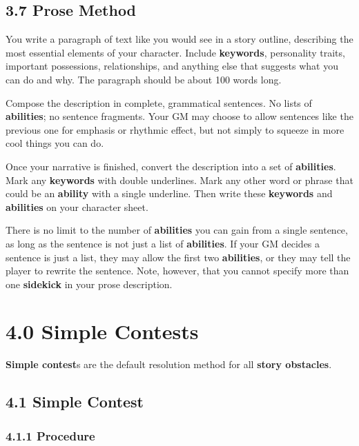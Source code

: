 \documentclass[
]{article}
\begin{document}
\hypertarget{prose-method}{%
\subsection{3.7 Prose Method}\label{prose-method}}

You write a paragraph of text like you would see in a story outline,
describing the most essential elements of your character. Include
\textbf{keywords}, personality traits, important possessions,
relationships, and anything else that suggests what you can do and why.
The paragraph should be about 100 words long.

Compose the description in complete, grammatical sentences. No lists of
\textbf{abilities}; no sentence fragments. Your GM may choose to allow
sentences like the previous one for emphasis or rhythmic effect, but not
simply to squeeze in more cool things you can do.

Once your narrative is finished, convert the description into a set of
\textbf{abilities}. Mark any \textbf{keywords} with double underlines.
Mark any other word or phrase that could be an \textbf{ability} with a
single underline. Then write these \textbf{keywords} and
\textbf{abilities} on your character sheet.

There is no limit to the number of \textbf{abilities} you can gain from
a single sentence, as long as the sentence is not just a list of
\textbf{abilities}. If your GM decides a sentence is just a list, they
may allow the first two \textbf{abilities}, or they may tell the player
to rewrite the sentence. Note, however, that you cannot specify more
than one \textbf{sidekick} in your prose description.

\hypertarget{simple-contests}{%
\section{4.0 Simple Contests}\label{simple-contests}}

\textbf{Simple contest}s are the default resolution method for all
\textbf{story obstacles}.

\hypertarget{simple-contest-1}{%
\subsection{4.1 Simple Contest}\label{simple-contest-1}}

\hypertarget{procedure}{%
\subsubsection{4.1.1 Procedure}\label{procedure}}
\end{document}
